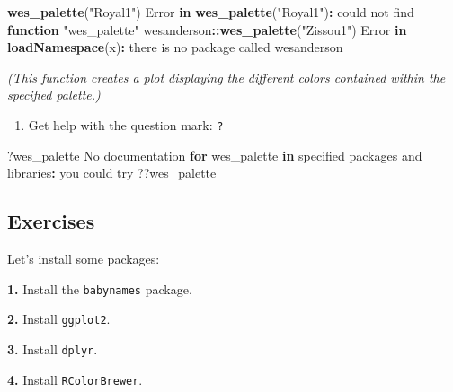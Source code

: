 \documentclass[
]{book}
\newenvironment{Shaded}{\begin{snugshade}}{\end{snugshade}}
\newcommand{\ControlFlowTok}[1]{\textcolor[rgb]{0.13,0.29,0.53}{\textbf{#1}}}
\newcommand{\FunctionTok}[1]{\textcolor[rgb]{0.13,0.29,0.53}{\textbf{#1}}}
\newcommand{\NormalTok}[1]{#1}
\newcommand{\SpecialCharTok}[1]{\textcolor[rgb]{0.81,0.36,0.00}{\textbf{#1}}}
\newcommand{\StringTok}[1]{\textcolor[rgb]{0.31,0.60,0.02}{#1}}
\providecommand{\tightlist}{%
  \setlength{\itemsep}{0pt}\setlength{\parskip}{0pt}}
\begin{document}
\begin{Shaded}
\begin{Highlighting}[]
\FunctionTok{wes\_palette}\NormalTok{(}\StringTok{"Royal1"}\NormalTok{)}
\NormalTok{Error }\ControlFlowTok{in} \FunctionTok{wes\_palette}\NormalTok{(}\StringTok{"Royal1"}\NormalTok{)}\SpecialCharTok{:}\NormalTok{ could not find }\ControlFlowTok{function} \StringTok{"wes\_palette"}
\NormalTok{wesanderson}\SpecialCharTok{::}\FunctionTok{wes\_palette}\NormalTok{(}\StringTok{"Zissou1"}\NormalTok{)}
\NormalTok{Error }\ControlFlowTok{in} \FunctionTok{loadNamespace}\NormalTok{(x)}\SpecialCharTok{:}\NormalTok{ there is no package called }\StringTok{\textquotesingle{}wesanderson\textquotesingle{}}
\end{Highlighting}
\end{Shaded}

\emph{(This function creates a plot displaying the different colors contained within the specified palette.)}

\begin{enumerate}
\def\labelenumi{\arabic{enumi}.}
\setcounter{enumi}{3}
\tightlist
\item
  Get help with the question mark: \texttt{?}
\end{enumerate}

\begin{Shaded}
\begin{Highlighting}[]
\NormalTok{?wes\_palette}
\NormalTok{No documentation }\ControlFlowTok{for} \StringTok{\textquotesingle{}wes\_palette\textquotesingle{}} \ControlFlowTok{in}\NormalTok{ specified packages and libraries}\SpecialCharTok{:}
\NormalTok{you could try }\StringTok{\textquotesingle{}??wes\_palette\textquotesingle{}}
\end{Highlighting}
\end{Shaded}

\subsection*{Exercises}\label{exercises-6}

Let's install some packages:

\textbf{1.} Install the \texttt{babynames} package.

\textbf{2.} Install \texttt{ggplot2}.

\textbf{3.} Install \texttt{dplyr}.

\textbf{4.} Install \texttt{RColorBrewer}.
\end{document}
